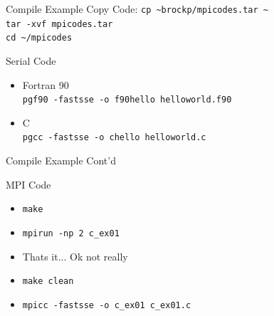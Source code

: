\documentclass{beamer}
\begin{document}
\begin{frame}{Compile Example}
 Copy Code: \texttt{cp \~{}brockp/mpicodes.tar \~{}} 
 \\ \texttt{tar -xvf mpicodes.tar}  \\ \texttt{cd \~{}/mpicodes}
 \begin{block}{Serial Code}
  \begin{itemize}
   \item Fortran 90
         \\ \texttt{pgf90 -fastsse -o f90hello helloworld.f90}
   \item C
         \\ \texttt{pgcc -fastsse -o chello helloworld.c}
  \end{itemize}
 \end{block}
\end{frame}
\begin{frame}{Compile Example Cont'd}
 \begin{block}{MPI Code}
  \begin{itemize}
   \item \texttt{make}
   \item \texttt{mpirun -np 2 c\_ex01}
   \item <2-> Thats it...  Ok not really
   \item <3-> \texttt{make clean}
   \item <3-> \texttt{mpicc -fastsse -o c\_ex01 c\_ex01.c}
  \end{itemize}
 \end{block}
\end{frame}
\end{document}
